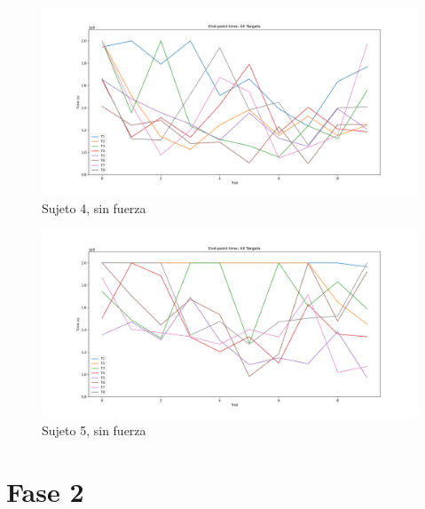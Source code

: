 \documentclass[a4paper,11pt, oneside]{book}
\begin{document}
\begin{figure}[H]
	\includegraphics[width=\linewidth]{sujeto4/no_force/evolution_time}
	\caption{Sujeto 4, sin fuerza}
	\label{4-1-3}
\end{figure}
\begin{figure}[H]
	\includegraphics[width=\linewidth]{sujeto5/no_force/evolution_time}
	\caption{Sujeto 5, sin fuerza}
	\label{5-1-3}
\end{figure}

\chapter{Fase 2}
\end{document}
